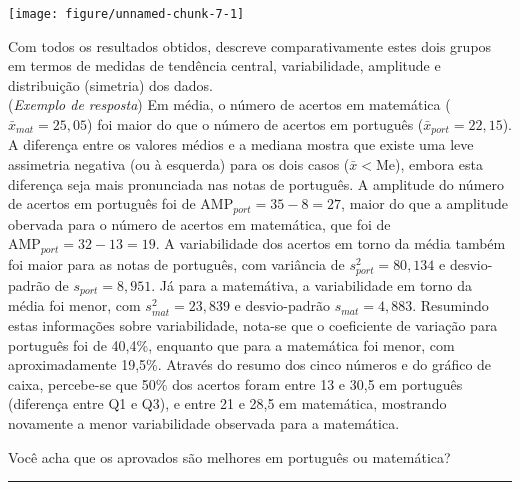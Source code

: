 \documentclass[a4paper,11pt,fleqn]{article}\usepackage[]{graphicx}\usepackage[]{color}
\newenvironment{knitrout}{}{} %
\theoremstyle{definition}
\begin{document}
\begin{compactenum}[4.]
\begin{compactenum}
\begin{knitrout}
{\centering \texttt{[image: figure/unnamed-chunk-7-1]} 

}



\end{knitrout}

\item Com todos os resultados obtidos, descreve comparativamente estes
    dois grupos em termos de medidas de tendência central,
    variabilidade, amplitude e distribuição (simetria) dos dados.\\
    (\textit{Exemplo de resposta}) Em média, o número de acertos em
    matemática ($\bar{x}_{mat} = 25,05$) foi maior do que o número de
    acertos em português ($\bar{x}_{port} = 22,15$). A diferença entre
    os valores médios e a mediana mostra que existe uma leve assimetria
    negativa (ou à esquerda) para os dois casos ($\bar{x} < \text{Me}$),
    embora esta diferença seja mais pronunciada nas notas de
    português. A amplitude do número de acertos em português foi de
    $\text{AMP}_{port} = 35-8=27$, maior do que a amplitude obervada
    para o número de acertos em matemática, que foi de
    $\text{AMP}_{port} = 32-13=19$. A variabilidade dos acertos em torno
    da média também foi maior para as notas de português, com variância
    de $s^2_{port} = 80,134$ e desvio-padrão de $s_{port} = 8,951$. Já
    para a matemátiva, a variabilidade em torno da média foi menor, com
    $s^2_{mat} = 23,839$ e desvio-padrão $s_{mat} = 4,883$. Resumindo
    estas informações sobre variabilidade, nota-se que o coeficiente de
    variação para português foi de 40,4\%, enquanto que para a
    matemática foi menor, com aproximadamente 19,5\%. Através do resumo
    dos cinco números e do gráfico de caixa, percebe-se que 50\% dos
    acertos foram entre 13 e 30,5 em português (diferença entre Q1 e
    Q3), e entre 21 e 28,5 em matemática, mostrando novamente a menor
    variabilidade observada para a matemática.
  \item Você acha que os aprovados são melhores em português ou
    matemática?
  \end{compactenum}
\end{compactenum}



\vspace{0.3cm}
\hrule
\vspace{0.3cm}
\end{document}
